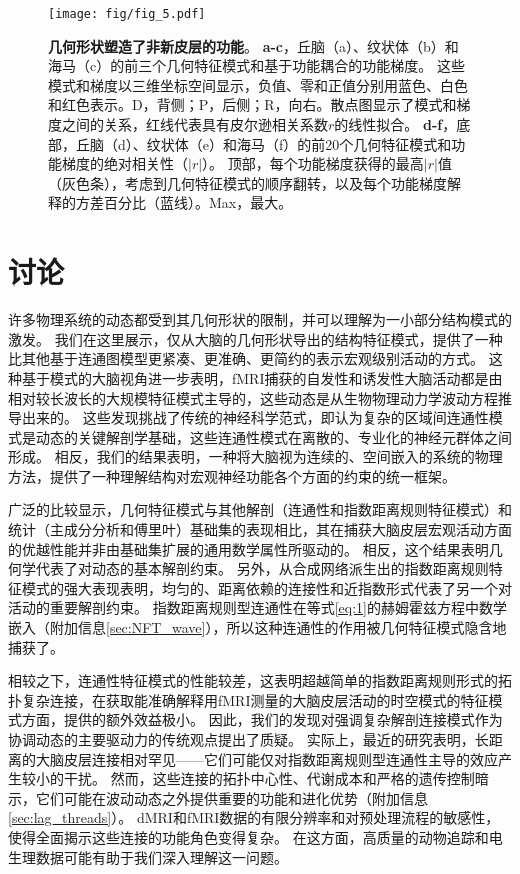 \documentclass[lang=cn,a4paper,newtx]{elegantpaper}
\begin{document}
\begin{figure}[!htb]
	\centering
	\texttt{[image: fig/fig\_5.pdf]}
	\caption{\textbf{几何形状塑造了非新皮层的功能}。
		\textbf{a-c}，丘脑（a）、纹状体（b）和海马（c）的前三个几何特征模式和基于功能耦合的功能梯度。
		这些模式和梯度以三维坐标空间显示，负值、零和正值分别用蓝色、白色和红色表示。D，背侧；P，后侧；R，向右。散点图显示了模式和梯度之间的关系，红线代表具有皮尔逊相关系数$ r $的线性拟合。
		\textbf{d-f}，底部，丘脑（d）、纹状体（e）和海马（f）的前20个几何特征模式和功能梯度的绝对相关性（$ |r| $）。
		顶部，每个功能梯度获得的最高$ |r| $值（灰色条），考虑到几何特征模式的顺序翻转，以及每个功能梯度解释的方差百分比（蓝线）。Max，最大。
	} \label{fig:5}
\end{figure}



\section{讨论}

许多物理系统的动态都受到其几何形状的限制，并可以理解为一小部分结构模式的激发。
我们在这里展示，仅从大脑的几何形状导出的结构特征模式，提供了一种比其他基于连通图模型更紧凑、更准确、更简约的表示宏观级别活动的方式。
这种基于模式的大脑视角进一步表明，fMRI捕获的自发性和诱发性大脑活动都是由相对较长波长的大规模特征模式主导的，这些动态是从生物物理动力学波动方程推导出来的。
这些发现挑战了传统的神经科学范式，即认为复杂的区域间连通性模式是动态的关键解剖学基础，这些连通性模式在离散的、专业化的神经元群体之间形成。
相反，我们的结果表明，一种将大脑视为连续的、空间嵌入的系统的物理方法，提供了一种理解结构对宏观神经功能各个方面的约束的统一框架。


广泛的比较显示，几何特征模式与其他解剖（连通性和指数距离规则特征模式）和统计（主成分分析和傅里叶）基础集的表现相比，其在捕获大脑皮层宏观活动方面的优越性能并非由基础集扩展的通用数学属性所驱动的。
相反，这个结果表明几何学代表了对动态的基本解剖约束。
另外，从合成网络派生出的指数距离规则特征模式的强大表现表明，均匀的、距离依赖的连接性和近指数形式代表了另一个对活动的重要解剖约束。
指数距离规则型连通性在等式\ref{eq:1}的赫姆霍兹方程中数学嵌入（附加信息\ref{sec:NFT_wave}），所以这种连通性的作用被几何特征模式隐含地捕获了。


相较之下，连通性特征模式的性能较差，这表明超越简单的指数距离规则形式的拓扑复杂连接，在获取能准确解释用fMRI测量的大脑皮层活动的时空模式的特征模式方面，提供的额外效益极小。
因此，我们的发现对强调复杂解剖连接模式作为协调动态的主要驱动力的传统观点提出了质疑。
实际上，最近的研究表明，长距离的大脑皮层连接相对罕见——它们可能仅对指数距离规则型连通性主导的效应产生较小的干扰。
然而，这些连接的拓扑中心性、代谢成本和严格的遗传控制暗示，它们可能在波动动态之外提供重要的功能和进化优势（附加信息\ref{sec:lag_threads}）。
dMRI和fMRI数据的有限分辨率和对预处理流程的敏感性，使得全面揭示这些连接的功能角色变得复杂。
在这方面，高质量的动物追踪和电生理数据可能有助于我们深入理解这一问题。
\end{document}
